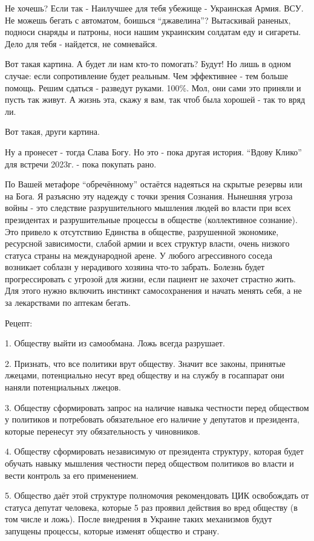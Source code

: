 \begin{itemize}
Не хочешь? Если так - Наилучшее для тебя убежище - Украинская Армия. ВСУ. Не
можешь бегать с автоматом, боишься \enquote{джавелина}? Вытаскивай раненых,
подноси снаряды и патроны, носи нашим украинским солдатам еду и сигареты. Дело
для тебя - найдется, не сомневайся.

Вот такая картина. А будет ли нам кто-то помогать? Будут! Но лишь в одном
случае: если сопротивление будет реальным. Чем эффективнее - тем больше
помощь. Решим сдаться - разведут руками. 100\%. Мол, они сами это приняли и
пусть так живут. А жизнь эта, скажу я вам, так чтоб была хорошей - так то вряд
ли.

Вот такая, други картина.

Ну а пронесет - тогда Слава Богу. Но это - пока другая история. \enquote{Вдову Клико}
для встречи 2023г. - пока покупать рано.



По Вашей метафоре \enquote{обречённому} остаётся надеяться на скрытые резервы или на
Бога. Я разъясню эту надежду с точки зрения Сознания. Нынешняя угроза войны -
это следствие разрушительного мышления людей во власти при всех президентах и
разрушительные процессы в обществе (коллективное сознание). Это привело к
отсутствию Единства в обществе, разрушенной экономике, ресурсной зависимости,
слабой армии и всех структур власти, очень низкого статуса страны на
международной арене. У любого агрессивного соседа возникает соблазн у
нерадивого хозяина что-то забрать. Болезнь будет прогрессировать с угрозой для
жизни, если пациент не захочет страстно жить. Для этого нужно включить инстинкт
самосохранения и начать менять себя, а не за лекарствами по аптекам бегать.

Рецепт: 

1. Обществу выйти из самообмана. Ложь всегда разрушает. 

2. Признать, что все политики врут обществу. Значит все законы, принятые
лжецами, потенциально несут вред обществу и на службу в госаппарат они наняли
потенциальных лжецов. 

3. Обществу сформировать запрос на наличие навыка честности перед обществом у
политиков и потребовать обязательное его наличие у депутатов и президента,
которые перенесут эту обязательность у чиновников. 

4.  Обществу сформировать независимую от президента структуру, которая будет
обучать навыку мышления честности перед обществом политиков во власти и вести
контроль за его применением. 

5. Общество даёт этой структуре полномочия рекомендовать ЦИК освобождать от
статуса депутат человека, которые 5 раз проявил действия во вред обществу (в
том числе и ложь). После внедрения в Украине таких механизмов будут запущены
процессы, которые изменят общество и страну.


\end{itemize}
